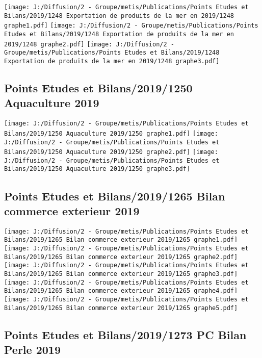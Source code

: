 \documentclass[
]{article}
\begin{document}
\texttt{[image: J:/Diffusion/2 - Groupe/metis/Publications/Points Etudes et Bilans/2019/1248 Exportation de produits de la mer en 2019/1248 graphe1.pdf]}
\texttt{[image: J:/Diffusion/2 - Groupe/metis/Publications/Points Etudes et Bilans/2019/1248 Exportation de produits de la mer en 2019/1248 graphe2.pdf]}
\texttt{[image: J:/Diffusion/2 - Groupe/metis/Publications/Points Etudes et Bilans/2019/1248 Exportation de produits de la mer en 2019/1248 graphe3.pdf]}

\hypertarget{points-etudes-et-bilans20191250-aquaculture-2019}{%
\subsection{Points Etudes et Bilans/2019/1250 Aquaculture
2019}\label{points-etudes-et-bilans20191250-aquaculture-2019}}

\texttt{[image: J:/Diffusion/2 - Groupe/metis/Publications/Points Etudes et Bilans/2019/1250 Aquaculture 2019/1250 graphe1.pdf]}
\texttt{[image: J:/Diffusion/2 - Groupe/metis/Publications/Points Etudes et Bilans/2019/1250 Aquaculture 2019/1250 graphe2.pdf]}
\texttt{[image: J:/Diffusion/2 - Groupe/metis/Publications/Points Etudes et Bilans/2019/1250 Aquaculture 2019/1250 graphe3.pdf]}

\hypertarget{points-etudes-et-bilans20191265-bilan-commerce-exterieur-2019}{%
\subsection{Points Etudes et Bilans/2019/1265 Bilan commerce exterieur
2019}\label{points-etudes-et-bilans20191265-bilan-commerce-exterieur-2019}}

\texttt{[image: J:/Diffusion/2 - Groupe/metis/Publications/Points Etudes et Bilans/2019/1265 Bilan commerce exterieur 2019/1265 graphe1.pdf]}
\texttt{[image: J:/Diffusion/2 - Groupe/metis/Publications/Points Etudes et Bilans/2019/1265 Bilan commerce exterieur 2019/1265 graphe2.pdf]}
\texttt{[image: J:/Diffusion/2 - Groupe/metis/Publications/Points Etudes et Bilans/2019/1265 Bilan commerce exterieur 2019/1265 graphe3.pdf]}
\texttt{[image: J:/Diffusion/2 - Groupe/metis/Publications/Points Etudes et Bilans/2019/1265 Bilan commerce exterieur 2019/1265 graphe4.pdf]}
\texttt{[image: J:/Diffusion/2 - Groupe/metis/Publications/Points Etudes et Bilans/2019/1265 Bilan commerce exterieur 2019/1265 graphe5.pdf]}

\hypertarget{points-etudes-et-bilans20191273-pc-bilan-perle-2019}{%
\subsection{Points Etudes et Bilans/2019/1273 PC Bilan Perle
2019}\label{points-etudes-et-bilans20191273-pc-bilan-perle-2019}}
\end{document}
